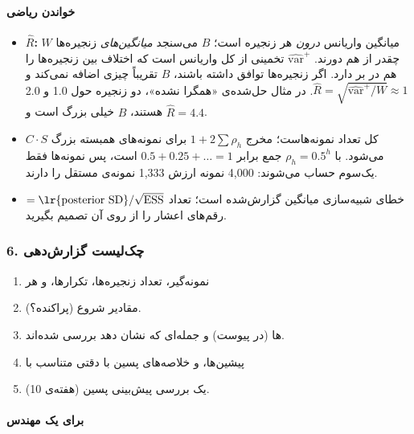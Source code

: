 \paragraph{خواندن ریاضی}

\begin{itemize}
\tightlist
\item
  \textbf{\(\hat R\):} \(W\) میانگین واریانس \emph{درون} هر زنجیره است؛
  \(B\) می‌سنجد \emph{میانگین‌های} زنجیره‌ها چقدر از هم دورند.
  \(\widehat{\mathrm{var}}^{+}\) تخمینی از کل واریانس  است
  که اختلاف بین زنجیره‌ها را هم در بر دارد. اگر زنجیره‌ها توافق داشته
  باشند، \(B\) تقریباً چیزی اضافه نمی‌کند و
  \(\hat R = \sqrt{\widehat{\mathrm{var}}^{+}/W} \approx 1\). در مثال
  حل‌شده‌ی «همگرا نشده»، دو زنجیره حول 1.0 و 2.0 هستند، \(B\) خیلی بزرگ
  است و \(\hat R = 4.4\).
\item
  \textbf{} \(C \cdot S\) کل تعداد نمونه‌هاست؛ مخرج
  \(1 + 2\sum\rho_h\) برای نمونه‌های همبسته بزرگ می‌شود. با
  \(\rho_h = 0.5^h\) جمع برابر \(0.5 + 0.25 + \dots = 1\) است، پس
  نمونه‌ها فقط یک‌سوم حساب می‌شوند: 4,000 نمونه ارزش 1,333 نمونه‌ی مستقل را
  دارند.
\item
  \textbf{} \(= \text{\lr{posterior SD}}/\sqrt{\mathrm{ESS}}\) خطای
  شبیه‌سازی میانگین گزارش‌شده است؛ تعداد رقم‌های اعشار را از روی آن تصمیم
  بگیرید.
\end{itemize}

\subsubsection{\texorpdfstring{6. چک‌لیست گزارش‌دهی
}{6. چک‌لیست گزارش‌دهی MCMC}}

\begin{enumerate}
\def\labelenumi{\arabic{enumi}.}
\tightlist
\item
  نمونه‌گیر، تعداد زنجیره‌ها، تکرارها،  و هر
\item
  مقادیر شروع (پراکنده؟).
\item
  ها (در پیوست) و جمله‌ای که نشان دهد بررسی شده‌اند.
\item
  پیشین‌ها، و خلاصه‌های پسین با دقتی متناسب با 
\item
  یک بررسی پیش‌بینی پسین (هفته‌ی 10).
\end{enumerate}

\paragraph{برای یک مهندس}

